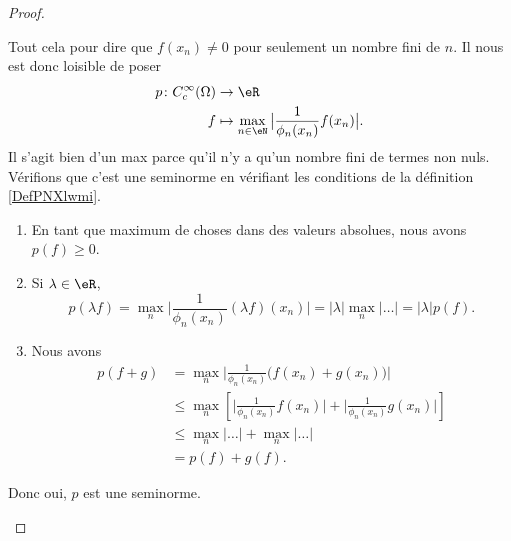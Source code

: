 \begin{proof}
\begin{subproof}
		Tout cela pour dire que \( f(x_n)\neq 0\) pour seulement un nombre fini de \( n\). Il nous est donc loisible de poser
		\begin{equation}
			\begin{aligned}
				p\colon C^{\infty}_c(\Omega) & \to \eR                                                          \\
				f                            & \mapsto \max_{n\in \eN}\big| \frac{1}{ \phi_n(x_n)}f(x_n) \big|.
			\end{aligned}
		\end{equation}
		Il s'agit bien d'un max parce qu'il n'y a qu'un nombre fini de termes non nuls. Vérifions que c'est une seminorme en vérifiant les conditions de la définition \ref{DefPNXlwmi}.
		\begin{enumerate}
			\item
			      En tant que maximum de choses dans des valeurs absolues, nous avons \( p(f)\geq 0\).
			\item
			      Si \( \lambda\in \eR\),
			      \begin{equation}
				      p(\lambda f)=\max_n\big|   \frac{1}{ \phi_n(x_n)}(\lambda f)(x_n)  \big|=| \lambda |\max_n\big| \ldots \big|=| \lambda |p(f).
			      \end{equation}
			\item
			      Nous avons
			      \begin{subequations}
				      \begin{align}
					      p(f+g) & =\max_n\big| \frac{1}{ \phi_n(x_n)}\big( f(x_n)+g(x_n) \big) \big|                                                  \\
					             & \leq \max_n  \left[    \big| \frac{1}{ \phi_n(x_n)}f(x_n) \big| +\big| \frac{1}{ \phi_n(x_n)}g(x_n) \big|   \right] \\
					             & \leq \max_n| \ldots |+\max_n| \ldots |                                                                              \\
					             & =p(f)+g(f).
				      \end{align}
			      \end{subequations}
		\end{enumerate}
		Donc oui, \( p\) est une seminorme.


\end{subproof}
\end{proof}
